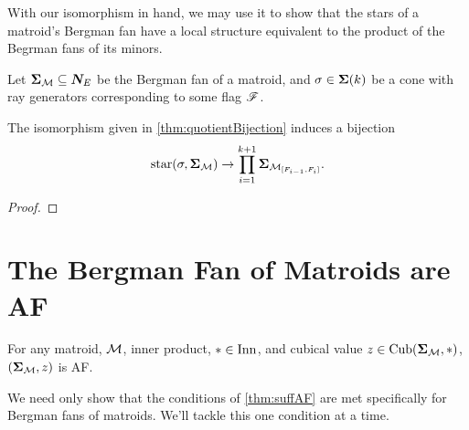 \documentclass[12pt,oneside]{../../sfsuthesis}
\begin{document}
With our isomorphism in hand, we may use it to show that the stars of a matroid's Bergman fan have a local structure equivalent to the product of the Begrman fans of its minors.

\begin{lemma}\th\label{thm:starBijection}
    Let \( \bm{\Sigma}_{\mathcal{M}} \subseteq \bm{N}_E \) be the Bergman fan of a matroid,
    and \( \sigma \in \bm{\Sigma}(k) \) be a cone with ray generators corresponding to some flag \( \mathscr{F} \).

    The isomorphism given in \th\ref{thm:quotientBijection} induces a bijection
    \[
        \operatorname{star}(\sigma, \bm{\Sigma}_{\mathcal{M}}) \to \prod_{i=1}^{k+1} \bm{\Sigma}_{\mathcal{M}_{[F_{i-1}, F_i]}}.
    \]
\end{lemma}
\begin{proof}
\end{proof}

\section{The Bergman Fan of Matroids are AF}


\begin{theorem}
    For any matroid, \( \mathcal{M} \), inner product, \( \ast \in \mathrm{Inn} \), and cubical value \( z \in \operatorname{Cub}(\bm{\Sigma}_{\mathcal{M}}, \ast) \),
    \( (\bm{\Sigma}_{\mathcal{M}}, z) \) is AF.
\end{theorem}

We need only show that the conditions of \th\ref{thm:suffAF} are met specifically for Bergman fans of matroids.
We'll tackle this one condition at a time.
\end{document}
